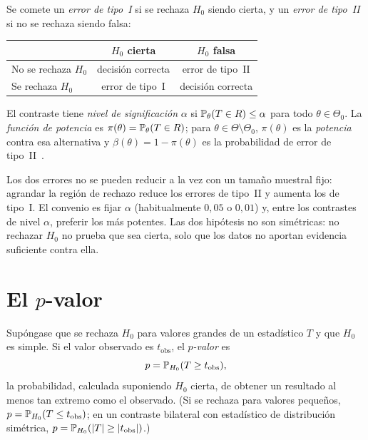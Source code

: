 \begin{definicion}\label{def:t5-errores}
Se comete un \emph{error de tipo~I} si se rechaza $H_0$ siendo cierta, y un \emph{error de tipo~II} si no se rechaza siendo falsa:
\begin{center}
\small
\begin{tabular}{@{}lcc@{}}
\toprule
 & $H_0$ cierta & $H_0$ falsa \\
\midrule
No se rechaza $H_0$ & decisión correcta & error de tipo~II \\
Se rechaza $H_0$ & error de tipo~I & decisión correcta \\
\bottomrule
\end{tabular}
\end{center}
El contraste tiene \emph{nivel de significación} $\alpha$ si $\mathbb{P}_\theta(T\in R)\le\alpha$ para todo $\theta\in\Theta_0$. La \emph{función de potencia} es $\pi(\theta)=\mathbb{P}_\theta(T\in R)$; para $\theta\in\Theta\setminus\Theta_0$, $\pi(\theta)$ es la \emph{potencia} contra esa alternativa y $\beta(\theta)=1-\pi(\theta)$ es la probabilidad de error de tipo~II~\cite[cap.~10]{wasserman}.
\end{definicion}

Los dos errores no se pueden reducir a la vez con un tamaño muestral fijo: agrandar la región de rechazo reduce los errores de tipo~II y aumenta los de tipo~I. El convenio es fijar $\alpha$ (habitualmente $0{,}05$ o $0{,}01$) y, entre los contrastes de nivel $\alpha$, preferir los más potentes. Las dos hipótesis no son simétricas: no rechazar $H_0$ no prueba que sea cierta, solo que los datos no aportan evidencia suficiente contra ella.

\section{El \texorpdfstring{$p$}{p}-valor}

\begin{definicion}[$p$-valor]\label{def:t5-pvalor}
Supóngase que se rechaza $H_0$ para valores grandes de un estadístico $T$ y que $H_0$ es simple. Si el valor observado es $t_{\mathrm{obs}}$, el \emph{$p$-valor} es
\[
p=\mathbb{P}_{H_0}(T\ge t_{\mathrm{obs}}),
\]
la probabilidad, calculada suponiendo $H_0$ cierta, de obtener un resultado al menos tan extremo como el observado. (Si se rechaza para valores pequeños, $p=\mathbb{P}_{H_0}(T\le t_{\mathrm{obs}})$; en un contraste bilateral con estadístico de distribución simétrica, $p=\mathbb{P}_{H_0}(\lvert T\rvert\ge\lvert t_{\mathrm{obs}}\rvert)$.)
\end{definicion}

